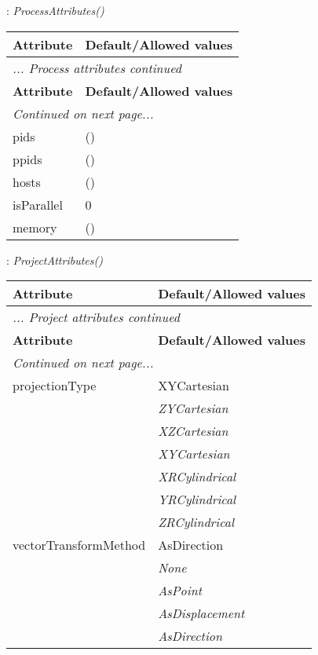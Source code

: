 \documentclass[10pt,a4paper]{report}
\begin{document}
\newpage

{}
: {\it ProcessAttributes() }\\[-3mm]

\begin{longtable}{ll}
{\bf Attribute} & {\bf Default/Allowed values} \\
\hline \hline
\endfirsthead
\multicolumn{2}{l}{{\it ... Process attributes continued}} \\
{\bf Attribute} & {\bf Default/Allowed values} \\
\hline \hline
\endhead
\hline
\multicolumn{2}{l}{{\it Continued on next page...}} \\
\endfoot
\hline
\endlastfoot

pids  &  () \\
ppids  &  () \\
hosts  &  () \\
isParallel  &  0 \\
memory  &  () \\
\end{longtable}

\newpage

{}
: {\it ProjectAttributes() }\\[-3mm]

\begin{longtable}{ll}
{\bf Attribute} & {\bf Default/Allowed values} \\
\hline \hline
\endfirsthead
\multicolumn{2}{l}{{\it ... Project attributes continued}} \\
{\bf Attribute} & {\bf Default/Allowed values} \\
\hline \hline
\endhead
\hline
\multicolumn{2}{l}{{\it Continued on next page...}} \\
\endfoot
\hline
\endlastfoot

projectionType  &  XYCartesian   \\
 & {\it  ZYCartesian} \\
 & {\it  XZCartesian} \\
 & {\it  XYCartesian} \\
 & {\it  XRCylindrical} \\
 & {\it  YRCylindrical} \\
 & {\it  ZRCylindrical} \\
vectorTransformMethod  &  AsDirection   \\
 & {\it  None} \\
 & {\it  AsPoint} \\
 & {\it  AsDisplacement} \\
 & {\it  AsDirection} \\
\end{longtable}
\end{document}
